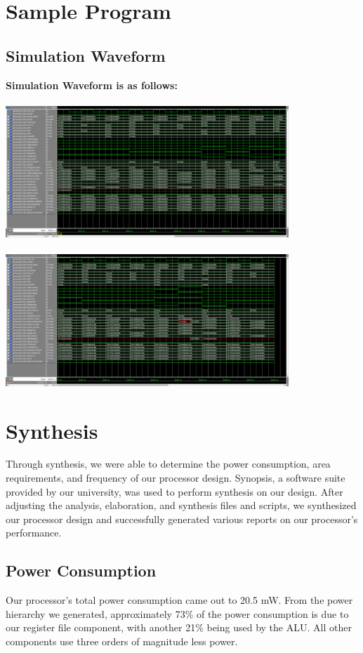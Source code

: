 \documentclass{article}
\begin{document}
\section{Sample Program}

	
	\subsection{Simulation Waveform}
	\bfseries{Simulation Waveform is as follows:} \\ \\
	\includegraphics[width=0.8\textwidth]{waveform_part1.png} \\ \\
	\includegraphics[width=0.8\textwidth]{waveform_part2.png}

\section{Synthesis}
Through synthesis, we were able to determine the power consumption, area requirements, and frequency of our processor design. Synopsis, a software suite provided by our university, was used to perform synthesis on our design. After adjusting the analysis, elaboration, and synthesis files and scripts, we synthesized our processor design and successfully generated various reports on our processor's performance.

\subsection{Power Consumption}
Our processor's total power consumption came out to 20.5 mW. From the power hierarchy we generated, approximately 73\% of the power consumption is due to our register file component, with another 21\% being used by the ALU. All other components use three orders of magnitude less power.
\end{document}
